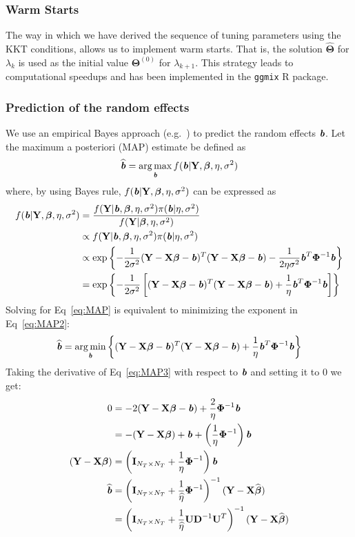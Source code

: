 \documentclass[10pt,letterpaper]{article}
\newcommand{\bX}{\textbf{X}}
\newcommand{\bY}{\textbf{Y}}
\newcommand{\bD}{\textbf{D}}
\newcommand{\bU}{\textbf{U}}
\newcommand{\bb}{\textbf{\emph{b}}}
\newcommand{\bI}{\textbf{I}}
\newcommand{\bTheta}{\boldsymbol{\Theta}}
\newcommand{\bbeta}{\boldsymbol{\beta}}
\newcommand{\bPhi}{\boldsymbol{\Phi}}
\DeclareMathOperator*{\argmin}{arg\,min}
\DeclareMathOperator*{\argmax}{arg\,max}
\begin{document}
\subsubsection*{Warm Starts}
The way in which we have derived the sequence of tuning parameters using the KKT conditions, allows us to implement warm starts. That is, the solution $\widehat{\bTheta}$ for $\lambda_k$ is used as the initial value $\bTheta^{(0)}$ for $\lambda_{k+1}$. This strategy leads to computational speedups and has been implemented in the \texttt{ggmix} R package.


\subsubsection*{Prediction of the random effects}
We use an empirical Bayes approach (e.g.~\cite{wakefield2013bayesian}) to predict the random effects $\bb$. Let the maximum a posteriori (MAP) estimate be defined as
\begin{equation}
\widehat{\bb} = \argmax_{\bb} f(\bb |  \bY, \bbeta, \eta, \sigma^2)  \label{eq:MAP}
\end{equation}
where, by using Bayes rule, $f(\bb |  \bY, \bbeta, \eta, \sigma^2)$ can be expressed as
\begin{align}
f(\bb |  \bY, \bbeta, \eta, \sigma^2) & = \frac{f(\bY | \bb,  \bbeta, \eta, \sigma^2)  \pi(\bb | \eta, \sigma^2)}{f(\bY |  \bbeta, \eta, \sigma^2)} \nonumber \\
& \propto f(\bY | \bb,  \bbeta, \eta, \sigma^2)  \pi(\bb | \eta, \sigma^2) \nonumber\\
& \propto \exp \left\lbrace - \frac{1}{2 \sigma^2} (\bY - \bX \bbeta - \bb)^T  (\bY - \bX \bbeta - \bb) - \frac{1}{2\eta \sigma^2}\bb^T \bPhi^{-1}\bb   \right \rbrace \nonumber\\
& = \exp \left\lbrace - \frac{1}{2 \sigma^2} \left[  (\bY - \bX \bbeta - \bb)^T (\bY - \bX \bbeta - \bb) + \frac{1}{\eta }\bb^T \bPhi^{-1}\bb \right]    \right \rbrace \label{eq:MAP2}
\end{align}
Solving for Eq~\ref{eq:MAP} is equivalent to minimizing the exponent in Eq~\ref{eq:MAP2}:
\begin{align}
\widehat{\bb} = \argmin_{\bb} \left\lbrace (\bY - \bX \bbeta - \bb)^T  (\bY - \bX \bbeta - \bb) + \frac{1}{\eta }\bb^T \bPhi^{-1}\bb  \right\rbrace \label{eq:MAP3}
\end{align}
Taking the derivative of Eq~\ref{eq:MAP3} with respect to $\bb$ and setting it to 0 we get:
\begin{align}
0 & = -2  (\bY - \bX \bbeta - \bb) + \frac{2}{\eta} \bPhi^{-1}\bb \nonumber \\
& = - (\bY - \bX \bbeta ) + \bb +  \left( \frac{1}{\eta}\bPhi^{-1}\right) \bb  \nonumber\\
(\bY - \bX \bbeta ) & = \left(\bI_{N_T \times N_T} +  \frac{1}{\eta}\bPhi^{-1}\right) \bb  \nonumber\\
\widehat{\bb} & = \left( \bI_{N_T \times N_T} +  \frac{1}{\widehat{\eta}}\bPhi^{-1}\right)^{-1}  (\bY - \bX \widehat{\bbeta} ) \nonumber \\
& = \left( \bI_{N_T \times N_T} +  \frac{1}{\widehat{\eta}} \bU \bD^{-1} \bU^T\right)^{-1}  (\bY - \bX \widehat{\bbeta} )
\end{align}
\end{document}
